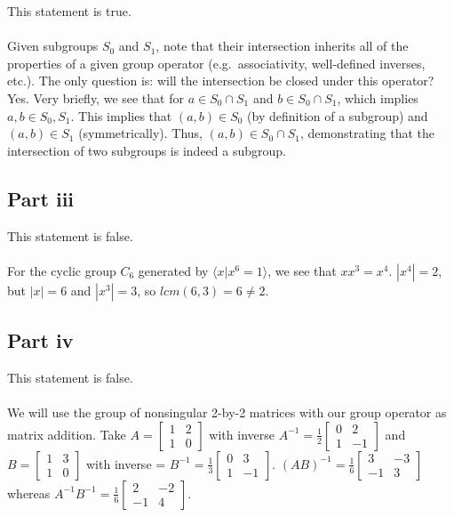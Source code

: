 \documentclass[letterpaper]{article}
\begin{document}
This statement is true.
\\ \\
Given subgroups $ S_0 $ and $ S_1 $, note that their intersection inherits all of the properties of a given group operator (e.g.\ associativity, well-defined inverses, etc.).
The only question is: will the intersection be closed under this operator?
Yes.
Very briefly, we see that for $ a \in S_0 \cap S_1 $ and $ b \in S_0 \cap S_1 $, which implies $ a, b \in S_0, S_1 $.
This implies that $ (a, b) \in S_0 $ (by definition of a subgroup) and $ (a, b) \in S_1 $ (symmetrically).
Thus, $ (a, b) \in S_0 \cap S_1 $, demonstrating that the intersection of two subgroups is indeed a subgroup.

\subsection{Part iii}
\label{subs:Partiii}

This statement is false.
\\ \\
For the cyclic group $ C_6 $ generated by $ \langle x | x^6 = 1 \rangle $, we see that $ xx^3 = x^4 $.
$ |x^4| = 2 $, but $ |x| = 6 $ and $ |x^3| = 3 $, so $ lcm(6, 3) = 6 \neq 2 $.

\subsection{Part iv}
\label{subs:Partiv}

This statement is false.
\\ \\
We will use the group of nonsingular 2-by-2 matrices with our group operator as matrix addition.
Take $ A = \begin{bmatrix} 1 & 2 \\ 1 & 0 \end{bmatrix} $ with inverse $ A^{-1} = \frac{1}{2} \begin{bmatrix} 0 & 2 \\ 1 & -1 \end{bmatrix} $ and $ B = \begin{bmatrix} 1 & 3 \\ 1 & 0 \end{bmatrix} $ with inverse = $ B^{-1} = \frac{1}{3} \begin{bmatrix} 0 & 3 \\ 1 & -1 \end{bmatrix} $.
$ {(AB)}^{-1} = \frac{1}{6} \begin{bmatrix} 3 & -3 \\ -1 & 3 \end{bmatrix} $ whereas $ A^{-1}B^{-1} = \frac{1}{6} \begin{bmatrix} 2 & -2 \\ -1 & 4 \end{bmatrix} $.
\end{document}
